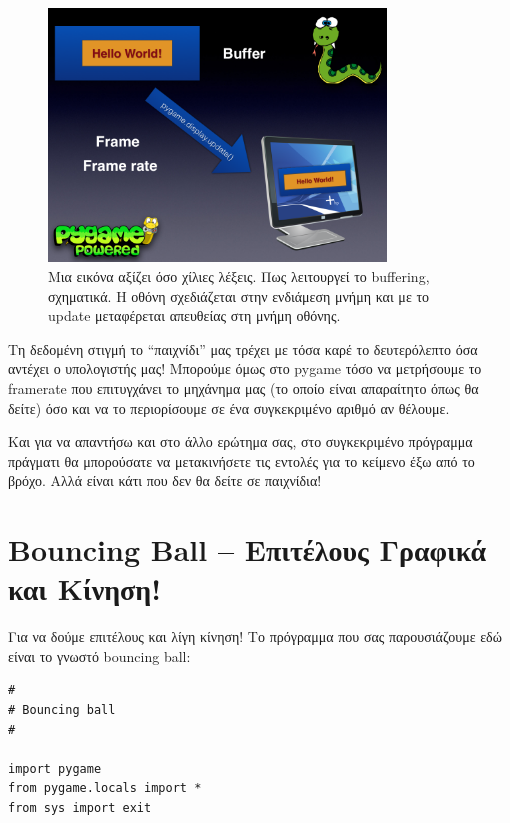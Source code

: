 \begin{figure}
  \centering
  \includegraphics[width=0.8\textwidth]{images/chapter4/buffers}
  \caption[Buffering]{Μια εικόνα αξίζει όσο χίλιες λέξεις. Πως λειτουργεί το buffering, σχηματικά. Η οθόνη σχεδιάζεται στην ενδιάμεση μνήμη και με το update μεταφέρεται απευθείας στη μνήμη οθόνης.}
  \label{4-5}
\end{figure}

Τη δεδομένη στιγμή το ``παιχνίδι'' μας τρέχει με τόσα καρέ το δευτερόλεπτο όσα αντέχει ο υπολογιστής μας! Μπορούμε όμως στο pygame τόσο να μετρήσουμε το framerate που επιτυγχάνει το μηχάνημα μας (το οποίο είναι απαραίτητο όπως θα δείτε) όσο και να το περιορίσουμε σε ένα συγκεκριμένο αριθμό αν θέλουμε.

Και για να απαντήσω και στο άλλο ερώτημα σας, στο συγκεκριμένο πρόγραμμα πράγματι θα μπορούσατε να μετακινήσετε τις εντολές για το κείμενο έξω από το βρόχο. Αλλά είναι κάτι που δεν θα δείτε σε παιχνίδια!

\section{Bouncing Ball -- Επιτέλους Γραφικά και Κίνηση!}

Για να δούμε επιτέλους και λίγη κίνηση! Το πρόγραμμα που σας παρουσιάζουμε εδώ είναι το γνωστό bouncing ball:

\begin{verbatim}
#
# Bouncing ball
#

import pygame
from pygame.locals import *
from sys import exit
\end{verbatim}

